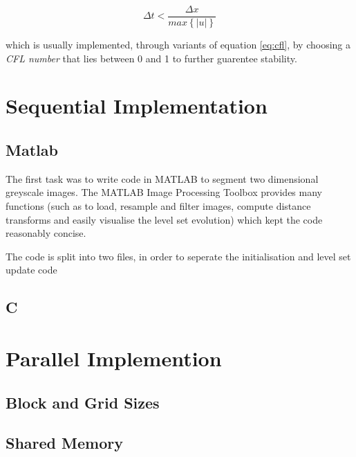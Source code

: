 \begin{equation}
\Delta t < \frac{\Delta x}{max\left\{|u|\right\}}
\label{eq:cfl}
\end{equation}

which is usually implemented, through variants of equation \eqref{eq:cfl}, by choosing a \textit{CFL number} that lies between 0 and 1 to further guarentee stability.

\section{Sequential Implementation}

	\subsection{Matlab}
The first task was to write code in MATLAB to segment two dimensional greyscale images. The MATLAB Image Processing Toolbox provides many functions (such as to load, resample and filter images, compute distance transforms and easily visualise the level set evolution) which kept the code reasonably concise. 

The code is split into two files, in order to seperate the initialisation and level set update code

	\subsection{C}

\section{Parallel Implemention}
	\subsection{Block and Grid Sizes}
	\subsection{Shared Memory}